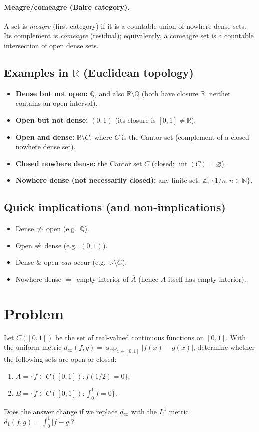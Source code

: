 \documentclass[12pt,a4paper]{article}
\begin{document}
\paragraph{Meagre/comeagre (Baire category).}
A set is \emph{meagre} (first category) if it is a countable union of nowhere dense sets.
Its complement is \emph{comeagre} (residual); equivalently, a comeagre set is a countable intersection of open dense sets.

\bigskip

\subsection*{Examples in $\mathbb{R}$ (Euclidean topology)}
\begin{itemize}
	\item \textbf{Dense but not open:} $\mathbb{Q}$, and also $\mathbb{R}\setminus\mathbb{Q}$ (both have closure $\mathbb{R}$, neither contains an open interval).
	\item \textbf{Open but not dense:} $(0,1)$ (its closure is $[0,1]\ne\mathbb{R}$).
	\item \textbf{Open and dense:} $\mathbb{R}\setminus C$, where $C$ is the Cantor set (complement of a closed nowhere dense set).
	\item \textbf{Closed nowhere dense:} the Cantor set $C$ (closed; $\operatorname{int}(C)=\varnothing$).
	\item \textbf{Nowhere dense (not necessarily closed):} any finite set; $\mathbb{Z}$; $\{1/n:n\in\mathbb{N}\}$.
\end{itemize}

\subsection*{Quick implications (and non-implications)}
\begin{itemize}
	\item Dense $\centernot\Rightarrow$ open (e.g.\ $\mathbb{Q}$).
	\item Open $\centernot\Rightarrow$ dense (e.g.\ $(0,1)$).
	\item Dense \& open \emph{can} occur (e.g.\ $\mathbb{R}\setminus C$).
	\item Nowhere dense $\Rightarrow$ empty interior of $\overline{A}$ (hence $A$ itself has empty interior).
\end{itemize}

	
\section*{Problem}
Let $C([0,1])$ be the set of real-valued continuous functions on $[0,1]$.
With the uniform metric $d_\infty(f,g)=\sup_{x\in[0,1]}|f(x)-g(x)|$, determine whether the following sets are open or closed:
\begin{enumerate}[label=(\alph*)]
	\item $A=\{f\in C([0,1]) : f(1/2)=0\}$;
	\item $B=\{f\in C([0,1]) : \int_0^1 f=0\}$.
\end{enumerate}
Does the answer change if we replace $d_\infty$ with the $L^1$ metric $d_1(f,g)=\int_0^1 |f-g|$?
\end{document}
